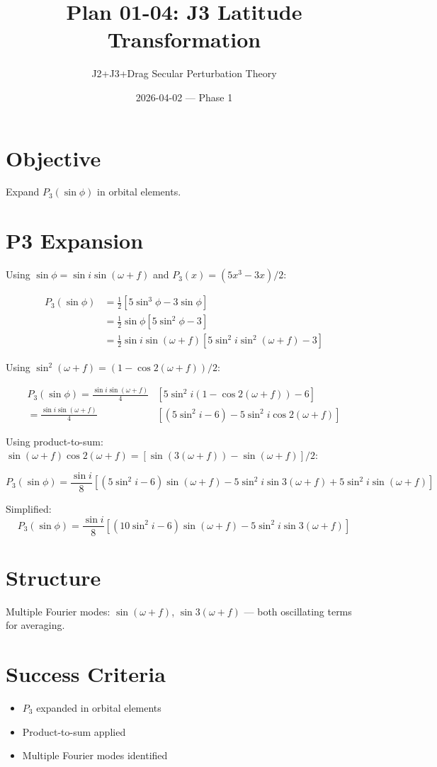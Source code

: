 \documentclass[11pt]{article}
\title{Plan 01-04: J3 Latitude Transformation}
\author{J2+J3+Drag Secular Perturbation Theory}
\date{2026-04-02 — Phase 1}
\begin{document}
\maketitle

\section{Objective}
Expand $P_3(\sin \phi)$ in orbital elements.

\section{P3 Expansion}

Using $\sin \phi = \sin i \sin(\omega + f)$ and $P_3(x) = (5x^3 - 3x)/2$:

\begin{align}
P_3(\sin \phi) &= \frac{1}{2}\left[5\sin^3 \phi - 3\sin \phi\right]\\
&= \frac{1}{2}\sin \phi\left[5\sin^2 \phi - 3\right]\\
&= \frac{1}{2}\sin i \sin(\omega+f)\left[5\sin^2 i \sin^2(\omega+f) - 3\right]
\end{align}

Using $\sin^2(\omega+f) = (1 - \cos 2(\omega+f))/2$:

\begin{align}
P_3(\sin \phi) = \frac{\sin i \sin(\omega+f)}{4}&\left[5\sin^2 i (1 - \cos 2(\omega+f)) - 6\right]\\
= \frac{\sin i \sin(\omega+f)}{4}&\left[(5\sin^2 i - 6) - 5\sin^2 i \cos 2(\omega+f)\right]
\end{align}

Using product-to-sum: $\sin(\omega+f)\cos 2(\omega+f) = [\sin(3(\omega+f)) - \sin(\omega+f)]/2$:

\begin{equation}
\boxed{P_3(\sin \phi) = \frac{\sin i}{8}\left[(5\sin^2 i - 6)\sin(\omega+f) - 5\sin^2 i \sin 3(\omega+f) + 5\sin^2 i \sin(\omega+f)\right]}
\end{equation}

Simplified:
\begin{equation}
P_3(\sin \phi) = \frac{\sin i}{8}\left[(10\sin^2 i - 6)\sin(\omega+f) - 5\sin^2 i \sin 3(\omega+f)\right]
\end{equation}

\section{Structure}
Multiple Fourier modes: $\sin(\omega+f)$, $\sin 3(\omega+f)$ — both oscillating terms for averaging.

\section{Success Criteria}
\begin{itemize}
    \item[$\checkmark$] $P_3$ expanded in orbital elements
    \item[$\checkmark$] Product-to-sum applied
    \item[$\checkmark$] Multiple Fourier modes identified
\end{itemize}
\end{document}
